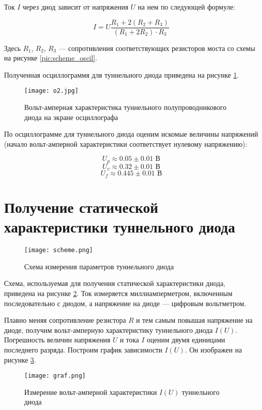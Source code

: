 \documentclass[a4paper,12pt]{article}
\begin{document}
Ток $I$ через диод зависит от напряжения $U$ на нем по следующей формуле: 
	
\[ I = U \frac{R_1 + 2(R_2 + R_3)}{(R_1 + 2R_2) \cdot R_3} \]
	
Здесь $R_1$, $R_2$, $R_3$ --- сопротивления соответствующих резисторов моста со схемы на рисунке \ref{pic:scheme_oscil}. 
	
Полученная осциллограммя для туннельного диода приведена на рисунке \ref{pic:tunnel_oscil}. 
	
\begin{figure}[h]
    \centering	
    \texttt{[image: o2.jpg]}
    \caption{Вольт-амперная характеристика туннельного полупроводникового диода на экране осциллографа}
    \label{pic:tunnel_oscil}
\end{figure}
	
По осциллограмме для туннельного диода оценим искомые величины напряжений (начало вольт-амперной характеристики соответствует нулевому напряжению): 
	
\[ U_p \approx 0.05 \pm  0.01 \text{ В} \]
\[ U_v \approx  0.32 \pm 0.01 \text{ В} \]
\[ U_f \approx  0.445 \pm 0.01 \text{ В} \]	
	
\section{Получение статической характеристики туннельного диода}
	
\begin{figure}[h]
    \centering	
    \texttt{[image: scheme.png]}
    \caption{Схема измерения параметров туннельного диода}
    \label{pic:scheme}
\end{figure}
	
Схема, используемая для получения статической характеристики диода, приведена на рисунке \ref{pic:scheme}. Ток измеряется миллиамперметром, включенным последовательно с диодом, а напряжение на диоде --- цифровым вольтметром. 
	
Плавно меняя сопротивление резистора $ R $ и тем самым повышая напряжение на диоде, получим вольт-амперную характеристику туннельного диода $I(U)$. Погрешность величин напряжения $U$ и тока $I$ оценим двумя единицами последнего разряда. Построим график зависимости $I(U)$. Он изображен на рисунке \ref{graf}. 
	
\begin{figure}[h]
    \texttt{[image: graf.png]}
    \caption{Измерение вольт-амперной характеристики $I(U)$ туннельного диода}
    \label{graf}
\end{figure}
\end{document}
